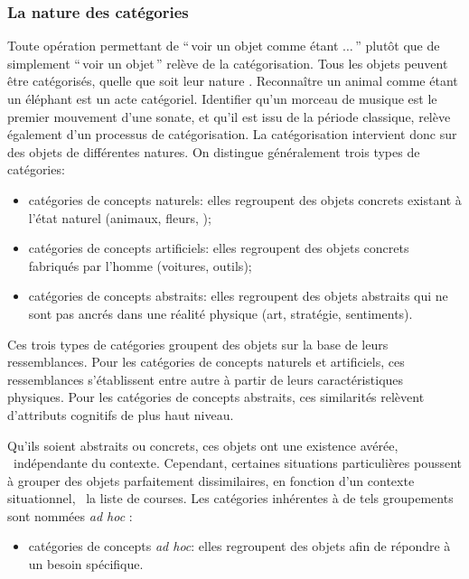 \subsubsection{La nature des catégories}

Toute opération permettant de ``\,voir un objet comme étant $\ldots$\,'' plutôt que de simplement ``\,voir un objet\,'' relève de la catégorisation. Tous les objets peuvent être catégorisés, quelle que soit leur nature \citep{goldstone2003concepts}. Reconnaître un animal comme étant un éléphant est un acte catégoriel. Identifier qu'un morceau de musique est le premier mouvement d'une sonate, et qu'il est issu de la période classique, relève également d'un processus de catégorisation. La catégorisation intervient donc sur des objets de différentes natures. On distingue généralement trois types de catégories:

\begin{itemize}
\item catégories de concepts naturels: elles regroupent des objets concrets existant à l'état naturel (animaux, fleurs, \etc);
\item catégories de concepts artificiels: elles regroupent des objets concrets fabriqués par l'homme (voitures, outils);
\item catégories de concepts abstraits: elles regroupent des objets abstraits qui ne sont pas ancrés dans une réalité physique (art, stratégie, sentiments).
\end{itemize}

Ces trois types de catégories groupent des objets sur la base de leurs ressemblances. Pour les catégories de concepts naturels et artificiels, ces ressemblances s'établissent entre autre à partir de leurs caractéristiques physiques. Pour les catégories de concepts abstraits, ces similarités relèvent d'attributs cognitifs de plus haut niveau. 

Qu'ils soient abstraits ou concrets, ces objets ont une existence avérée, \ie~indépendante du contexte. Cependant, certaines situations particulières poussent à grouper des objets parfaitement dissimilaires, en fonction d'un contexte situationnel, \eg~la liste de courses. Les catégories inhérentes à de tels groupements sont nommées \emph{ad hoc} \citep{barsalou1983ad}:

\begin{itemize}
 \item catégories de concepts \emph{ad hoc}: elles regroupent des objets afin de répondre à un besoin spécifique.
\end{itemize}

